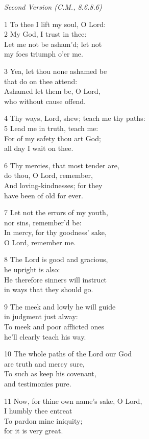 \begin{multicols}{3}
\begin{center}
\quad{}\quad{}
\end{center}

\emph{Second Version (C.M., 8.6.8.6)}

1 To thee I lift my soul, O Lord:\\
2 My God, I trust in thee:\\
Let me not be asham’d; let not\\
my foes triumph o’er me.

3 Yea, let thou none ashamed be\\
that do on thee attend:\\
Ashamed let them be, O Lord,\\
who without cause offend.

4 Thy ways, Lord, shew; teach me thy paths:\\
5 Lead me in truth, teach me:\\
For of my safety thou art God;\\
all day I wait on thee.

6 Thy mercies, that most tender are,\\
do thou, O Lord, remember,\\
And loving-kindnesses; for they\\
have been of old for ever.

7 Let not the errors of my youth,\\
nor sins, remember’d be:\\
In mercy, for thy goodness’ sake,\\
O Lord, remember me.

8 The Lord is good and gracious,\\
he upright is also:\\
He therefore sinners will instruct\\
in ways that they should go.

9 The meek and lowly he will guide\\
in judgment just alway:\\
To meek and poor afflicted ones\\
he’ll clearly teach his way.

10 The whole paths of the Lord our God\\
are truth and mercy sure,\\
To such as keep his covenant,\\
and testimonies pure.

11 Now, for thine own name’s sake, O Lord,\\
I humbly thee entreat\\
To pardon mine iniquity;\\
for it is very great.


\end{multicols}
